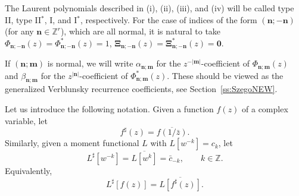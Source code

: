\documentclass[reqno,centertags,11pt,draft]{amsart}
\newcommand{\Z}{\mathbb{Z}}
\newcommand{\abs}[1]{\left|#1\right|}
\begin{document}
The Laurent polynomials described in   (i), (ii),  (iii), and (iv) will be called type II, type II$^*$, I, and I$^*$, respectively. For the case of indices of the form $(\bm{n};-\bm{n})$ (for any $\bm{n}\in\Z^r$), which are all normal, it is natural to take $\Phi_{\bm{n};-\bm{n}}(z) = \Phi^*_{\bm{n};-\bm{n}}(z) = 1$, $\bm{\Xi}_{\bm{n};-\bm{n}}(z) = \bm{\Xi}^*_{\bm{n};-\bm{n}}(z) = \bm{0}$. 

If $(\bm{n};\bm{m})$ is normal, we will write $\alpha_{\bm{n};\bm{m}}$ for the $z^{-\abs{\bm{m}}}$-coefficient of $\Phi_{\bm{n};\bm{m}}(z)$ and $\beta_{\bm{n};\bm{m}}$ for the $z^{\abs{\bm{n}}}$-coefficient of $\Phi_{\bm{n};\bm{m}}^*(z)$. These should be viewed as the generalized Verblunsky %
recurrence coefficients, see Section~\ref{ss:SzegoNEW}.


Let us introduce the following notation. Given a function $f(z)$ of a complex variable, let
\begin{equation}\label{eq:sharp1}
        f^\sharp(z) = \overline{f(1/\bar{z})}.
\end{equation}
Similarly, given a moment functional $L$ with $L[w^{-k}] = c_k$, let
\begin{equation}\label{eq:sharp2}
        L^\sharp[w^{-k}] = \overline{L[w^k]} = \bar{c}_{-k}, \qquad k\in\Z.
\end{equation}
Equivalently,
\begin{equation}\label{eq:sharp3}
    L^\sharp[f(z)] = \overline{L[f^\sharp(z)]}.
\end{equation}
\end{document}
